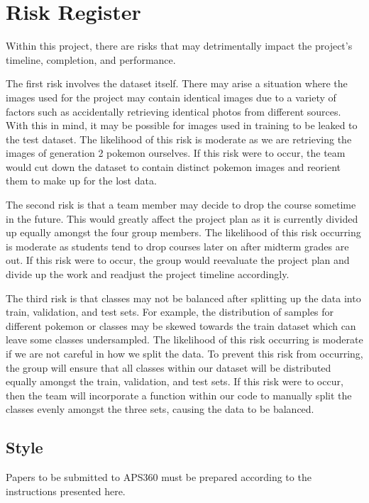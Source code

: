 \documentclass{article} %
\begin{document}
\section {Risk Register}

Within this project, there are risks that may detrimentally impact the project’s timeline, 
completion, and performance. 

The first risk involves the dataset itself. There may arise a situation where the images used for the project may contain identical images due to a variety of factors such as accidentally retrieving identical photos from different sources. With this in mind, it may be possible for images used in training to be leaked to the test dataset. The likelihood of this risk is moderate as we are retrieving the images of generation 2 pokemon ourselves. If this risk were to occur, the team would cut down the dataset to contain distinct pokemon images and reorient them to make up for the lost data.

The second risk is that a team member may decide to drop the course sometime in the future. This would greatly affect the project plan as it is currently divided up equally amongst the four group members. The likelihood of this risk occurring is moderate as students tend to drop courses later on after midterm grades are out. If this risk were to occur, the group would reevaluate the project plan and divide up the work and readjust the project timeline accordingly. 

The third risk is that classes may not be balanced after splitting up the data into train, validation, and test sets. For example, the distribution of samples for different pokemon or classes may be skewed towards the train dataset which can leave some classes undersampled. The likelihood of this risk occurring is moderate if we are not careful in how we split the data. To prevent this risk from occurring, the group will ensure that all classes within our dataset will be distributed equally amongst the train, validation, and test sets. If this risk were to occur, then the team will incorporate a function within our code to manually split the classes evenly amongst the three sets, causing the data to be balanced. 

\subsection{Style}

Papers to be submitted to APS360 must be prepared according to the
instructions presented here.
\end{document}
